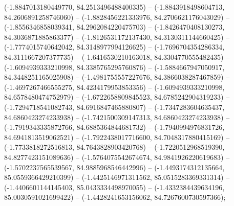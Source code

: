 (-1.8847013180449770, 84.2513496488400335) -- (-1.8843918498604713, 84.2606891258746060) -- (-1.8828456221333976, 84.2706621176043029) -- (-1.8556346858039341, 84.2962084220475703) -- (-1.8426470408130273, 84.3036871885863377) -- (-1.8126531172137430, 84.3130311144660425) -- (-1.7774015740642042, 84.3148977994126625) -- (-1.7696704354286334, 84.3111667207377735) -- (-1.6416530210163018, 84.3304770555482435) -- (-1.6094939333210998, 84.3385765295760876) -- (-1.5884667947050917, 84.3448251165025908) -- (-1.4981755557227676, 84.3866038287467859) -- (-1.4697267466555275, 84.4234179953853356) -- (-1.6094939333210998, 84.6578480474752979) -- (-1.6722658809845523, 84.6785242904319233) -- (-1.7294718541082743, 84.6916847465880807) -- (-1.7347283604635437, 84.6860423274233938) -- (-1.7421500309147313, 84.6860423274233938) -- (-1.7919343335872766, 84.6885364844681732) -- (-1.7940994976831726, 84.6941813519062521) -- (-1.7922438017716600, 84.7048317880415169) -- (-1.7733818272516813, 84.7643828903420768) -- (-1.7220512968519390, 84.8277423151089636) -- (-1.5764075542674674, 84.9841926220619683) -- (-1.5702237565539567, 84.9885968546442996) -- (-1.4493174312135664, 85.0559366429210399) -- (-1.4425146971311562, 85.0515283369331314) -- (-1.4406601144145403, 85.0433334498970055) -- (-1.4332384439634196, 85.0030591021699422) -- (-1.4428241653156062, 84.7267600730597366);

